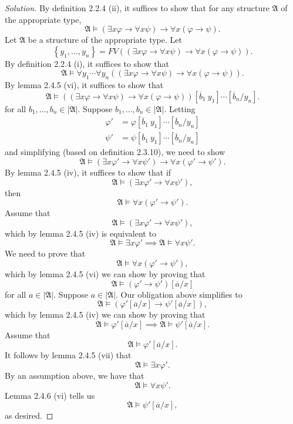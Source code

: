 \documentclass[letter]{article}
\newcommand{\abs}[1]{\left\lvert#1\right\rvert}
\theoremstyle{definition}
\newenvironment{solution}
{\begin{proof}[Solution]}
        {\end{proof}}
\renewcommand{\phi}{\varphi}
\newcommand*{\braces}[1]{\left\{#1\right\}}
\newcommand*{\bracks}[1]{\left\lbrack{#1}\right\rbrack}
\newcommand*{\parens}[1]{\left({#1}\right)}
\begin{document}
\begin{solution}
By definition 2.2.4 (ii), it suffices to show that
for any structure $\mathfrak A$ of the appropriate type,
\[\mathfrak A \models (\exists x \phi \to \forall x \psi) \to \forall x (\phi \to \psi).\]
Let $\mathfrak A$ be a structure of the appropriate type.
Let \[\braces{y_1, \ldots, y_n} =
  FV\parens{\parens{\exists x \phi \to \forall x \psi}
  \to \forall x \parens{\phi \to \psi}}.\]
By definition 2.2.4 (i), it suffices to show that
\[\mathfrak A \models \forall y_1 \cdots \forall y_n
  \parens{(\exists x \phi \to \forall x \psi) \to \forall x (\phi \to \psi)}.\]
By lemma 2.4.5 (vi), it suffices to show that
\[\mathfrak A \models \parens{(\exists x \phi \to \forall x \psi) \to \forall x (\phi \to \psi)}
  \bracks{\overline b_1 \ y_1} \cdots \bracks{\overline b_n / y_n}.\]
for all $b_1, \ldots, b_n \in \abs{\mathfrak A}$.
Suppose $b_1, \ldots, b_n \in \abs{\mathfrak A}$.
Letting
\begin{align*}
\phi' &= \phi \bracks{\overline b_1 \ y_1} \cdots \bracks{\overline b_n / y_n} \\
\psi' &= \psi \bracks{\overline b_1 \ y_1} \cdots \bracks{\overline b_n / y_n}
\end{align*}
and simplifying (based on definition 2.3.10), we need to show
\[\mathfrak A \models (\exists x \phi' \to \forall x \psi') \to \forall x (\phi' \to \psi').\]
By lemma 2.4.5 (iv), it suffices to show that if
\[\mathfrak A \models (\exists x \phi' \to \forall x \psi'),\]
then
\[\mathfrak A \models \forall x (\phi' \to \psi').\]
Assume that
\[\mathfrak A \models (\exists x \phi' \to \forall x \psi'),\]
which by lemma 2.4.5 (iv) is equivalent to
\[\mathfrak A \models \exists x \phi' \implies \mathfrak A \models \forall x \psi'.\]
We need to prove that
\[\mathfrak A \models \forall x (\phi' \to \psi'),\]
which by lemma 2.4.5 (vi) we can show by proving that
\[\mathfrak A \models (\phi' \to \psi') \bracks{\overline a / x}\]
for all $a \in \abs{\mathfrak A}$.
Suppose $a \in \abs{\mathfrak A}$.
Our obligation above simplifies to
\[\mathfrak A \models (\phi' \bracks{\overline a / x} \to \psi' \bracks{\overline a / x}),\]
which by lemma 2.4.5 (iv) we can show by proving that
\[\mathfrak A \models \phi' \bracks{\overline a / x} \implies
  \mathfrak A \models \psi' \bracks{\overline a / x}.\]
Assume that
\[\mathfrak A \models \phi' \bracks{\overline a / x}.\]
It follows by lemma 2.4.5 (vii) that
\[\mathfrak A \models \exists x \phi'.\]
By an assumption above, we have that
\[\mathfrak A \models \forall x \psi'.\]
Lemma 2.4.6 (vi) tells us
\[\mathfrak A \models \psi' \bracks{\overline a / x},\]
as desired.
\end{solution}
\end{document}
